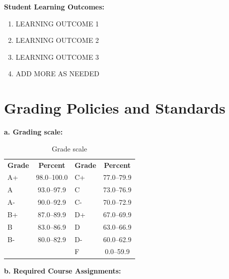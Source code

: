 \documentclass[12pt]{article}     %
\begin{document}
\vspace{1em}
\noindent \textbf{Student Learning Outcomes:}
\begin{enumerate}
\item LEARNING OUTCOME 1
\item LEARNING OUTCOME 2
\item LEARNING OUTCOME 3
\item ADD MORE AS NEEDED
\end{enumerate}

\section*{Grading Policies and Standards}

\noindent \textbf{a. Grading scale:}

\begin{center}
\begin{table}[h]
  \caption{Grade scale}
  \centering
  \begin{tabular}{l c l c}
  \rowcolor{csufTableHeader}
  \textbf{Grade} & \textbf{Percent} & \textbf{Grade} & \textbf{Percent} \\
  A+    & 98.0--100.0& C+    & 77.0--79.9 \\
  A     & 93.0--97.9 & C     & 73.0--76.9 \\
  A-    & 90.0--92.9 & C-    & 70.0--72.9 \\
  B+    & 87.0--89.9 & D+    & 67.0--69.9 \\
  B     & 83.0--86.9 & D     & 63.0--66.9 \\
  B-    & 80.0--82.9 & D-    & 60.0--62.9 \\
        &            & F     & 0.0--59.9 \\
  \end{tabular}
\end{table}

\end{center}

\vspace{1em}
\noindent \textbf{b. Required Course Assignments:}
\end{document}
